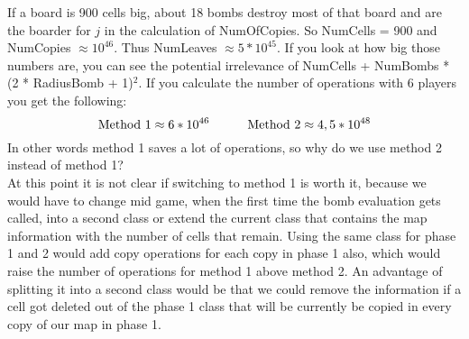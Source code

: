 If a board is 900 cells big, about 18 bombs destroy most of that board and are the boarder for $j$ in the calculation of NumOfCopies. So NumCells = 900 and NumCopies $\approx 10^{46}$. Thus NumLeaves $\approx 5*10^{45}$. If you look at how big those numbers are, you can see the potential irrelevance of NumCells + NumBombs * (2 * RadiusBomb + 1)$^2$. If you calculate the number of operations with 6 players you get the following:
$$ \text{Method 1} \approx 6 * 10^{46} \hspace{30px} \text{Method 2} \approx 4,5*10^{48} $$
In other words method 1 saves a lot of operations, so why do we use method 2 instead of method 1? \\
At this point it is not clear if switching to method 1 is worth it, because we would have to change mid game, when the first time the bomb evaluation gets called, into a second class or extend the current class that contains the map information with the number of cells that remain. Using the same class for phase 1 and 2 would add copy operations for each copy in phase 1 also, which would raise the number of operations for method 1 above method 2. An advantage of splitting it into a second class would be that we could remove the information if a cell got deleted out of the phase 1 class that will be currently be copied in every copy of our map in phase 1.